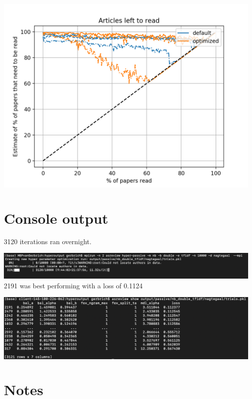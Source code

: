 \documentclass[
]{book}
\begin{document}
\includegraphics{figs/myfirstsim/Figure_3.png}

\pagebreak

\hypertarget{console-output}{%
\section{Console output}\label{console-output}}

3120 iterations ran overnight.

\includegraphics{figs/myfirstsim/computation.png}
2191 was best performing with a loss of 0.1124

\includegraphics{figs/myfirstsim/optmizationresult.png}

\hypertarget{notes}{%
\section{Notes}\label{notes}}
\end{document}
